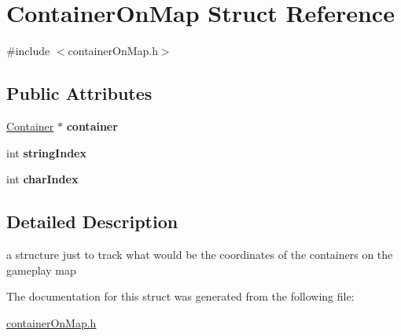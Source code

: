\hypertarget{struct_container_on_map}{}\section{Container\+On\+Map Struct Reference}
\label{struct_container_on_map}


{\ttfamily \#include $<$container\+On\+Map.\+h$>$}

\subsection*{Public Attributes}
\begin{DoxyCompactItemize}
\item 
\hypertarget{struct_container_on_map_ae1df8d0f0675cf981e411cca41f03913}{}\label{struct_container_on_map_ae1df8d0f0675cf981e411cca41f03913} 
\hyperlink{class_container}{Container} $\ast$ {\bfseries container}
\item 
\hypertarget{struct_container_on_map_af0cec419059f87b45ab740fb9eaefd4a}{}\label{struct_container_on_map_af0cec419059f87b45ab740fb9eaefd4a} 
int {\bfseries string\+Index}
\item 
\hypertarget{struct_container_on_map_a87852d390130c8c650880fea7bedb11f}{}\label{struct_container_on_map_a87852d390130c8c650880fea7bedb11f} 
int {\bfseries char\+Index}
\end{DoxyCompactItemize}


\subsection{Detailed Description}
a structure just to track what would be the coordinates of the containers on the gameplay map 

The documentation for this struct was generated from the following file\+:\begin{DoxyCompactItemize}
\item 
\hyperlink{container_on_map_8h}{container\+On\+Map.\+h}\end{DoxyCompactItemize}
